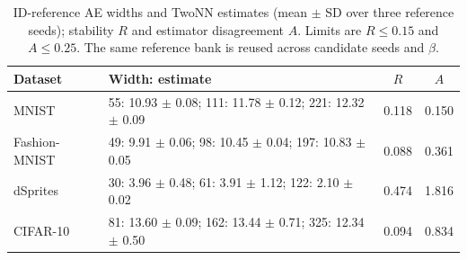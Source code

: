 \begin{table}[H]\caption{ID-reference AE widths and TwoNN estimates (mean $\pm$ SD over three reference seeds); stability $R$ and estimator disagreement $A$. Limits are $R\le0.15$ and $A\le0.25$. The same reference bank is reused across candidate seeds and $\beta$.}\label{tab:id}
\footnotesize\begin{tabularx}{\textwidth}{lXcc}\toprule
Dataset & Width: estimate & $R$ & $A$ \\
\midrule
MNIST & 55: 10.93 $\pm$ 0.08; 111: 11.78 $\pm$ 0.12; 221: 12.32 $\pm$ 0.09 & 0.118 & 0.150 \\
Fashion-MNIST & 49: 9.91 $\pm$ 0.06; 98: 10.45 $\pm$ 0.04; 197: 10.83 $\pm$ 0.05 & 0.088 & 0.361 \\
dSprites & 30: 3.96 $\pm$ 0.48; 61: 3.91 $\pm$ 1.12; 122: 2.10 $\pm$ 0.02 & 0.474 & 1.816 \\
CIFAR-10 & 81: 13.60 $\pm$ 0.09; 162: 13.44 $\pm$ 0.71; 325: 12.34 $\pm$ 0.50 & 0.094 & 0.834 \\
\bottomrule\end{tabularx}\end{table}